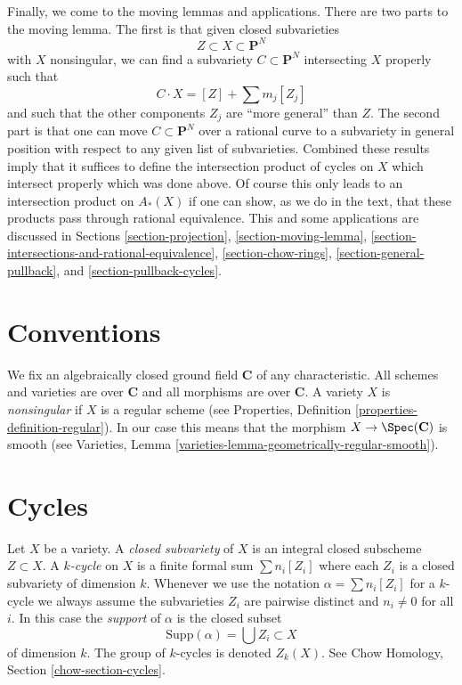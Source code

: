 \medskip\noindent
Finally, we come to the moving lemmas and applications. There are two
parts to the moving lemma. The first is that given closed subvarieties
$$
Z \subset X \subset \mathbf{P}^N
$$
with $X$ nonsingular, we can find a subvariety $C \subset \mathbf{P}^N$
intersecting $X$ properly such that
$$
C \cdot X = [Z] + \sum m_j [Z_j]
$$
and such that the other components $Z_j$ are ``more general'' than $Z$.
The second part is that one can move $C \subset \mathbf{P}^N$ over
a rational curve to a subvariety in general position with respect to
any given list of subvarieties. Combined these results imply that it suffices
to define the intersection product of cycles on $X$ which intersect
properly which was done above. Of course this only leads to an intersection
product on $A_*(X)$ if one can show, as we do in the text, that these products
pass through rational equivalence. This and some applications are discussed 
in Sections
\ref{section-projection},
\ref{section-moving-lemma},
\ref{section-intersections-and-rational-equivalence},
\ref{section-chow-rings},
\ref{section-general-pullback}, and
\ref{section-pullback-cycles}.



\section{Conventions}
\label{section-conventions}

\noindent
We fix an algebraically closed ground field $\mathbf{C}$ of any
characteristic. All schemes and varieties are over $\mathbf{C}$ and all
morphisms are over $\mathbf{C}$. A variety $X$ is
{\it nonsingular} if $X$ is a regular scheme (see
Properties, Definition \ref{properties-definition-regular}).
In our case this means that the morphism $X \to \Spec(\mathbf{C})$
is smooth (see
Varieties, Lemma \ref{varieties-lemma-geometrically-regular-smooth}).


\section{Cycles}
\label{section-cycles}

\noindent
Let $X$ be a variety. A {\it closed subvariety} of $X$ is an integral
closed subscheme $Z \subset X$. A {\it $k$-cycle} on $X$ is a finite
formal sum $\sum n_i [Z_i]$ where each $Z_i$ is a closed subvariety
of dimension $k$. Whenever we use the notation $\alpha = \sum n_i[Z_i]$
for a $k$-cycle we always assume the subvarieties $Z_i$ are pairwise
distinct and $n_i \not = 0$ for all $i$. In this case the
{\it support} of $\alpha$ is the closed subset
$$
\text{Supp}(\alpha) = \bigcup Z_i \subset X
$$
of dimension $k$. The group of $k$-cycles is denoted $Z_k(X)$.
See Chow Homology, Section \ref{chow-section-cycles}.



